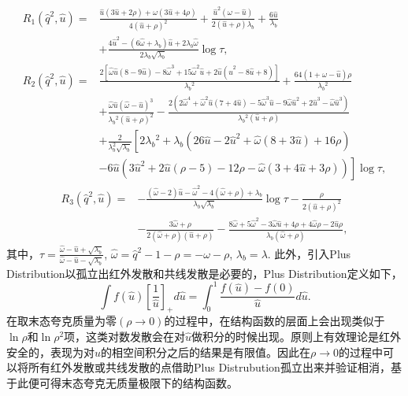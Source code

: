 $$
\begin{aligned}
R_1\left(\hat{q}^2, \hat{u}\right)= & \frac{\hat{u}(3 \hat{u}+2 \rho)+\omega(3 \hat{u}+4 \rho)}{4(\hat{u}+\rho)^2}+\frac{\hat{u}^2(\omega-\hat{u})}{2(\hat{u}+\rho) \lambda_b}+\frac{6 \hat{u}}{\lambda_b} \\
& +\frac{4 \hat{u}^2-\left(6 \hat{\omega}+\lambda_b\right) \hat{u}+2 \lambda_b \hat{\omega}}{2 \lambda_b \sqrt{\lambda_b}} \log \tau, \\
R_2\left(\hat{q}^2, \hat{u}\right)= & \frac{2\left[\hat{\omega} \hat{u}(8-9 \hat{u})-8 \hat{\omega}^3+15 \hat{\omega}^2 \hat{u}+2 \hat{u}\left(\hat{u}^2-8 \hat{u}+8\right)\right]}{\lambda_b{ }^2}+\frac{64(1+\hat{\omega}-\hat{u}) \rho}{\lambda_b{ }^2} \\
& +\frac{\hat{\omega} \hat{u}(\hat{\omega}-\hat{u})^3}{\lambda_b{ }^2(\hat{u}+\rho)^2}-\frac{2\left(2 \hat{\omega}^4+\hat{\omega}^2 \hat{u}(7+4 \hat{u})-5 \hat{\omega}^3 \hat{u}-9 \hat{\omega} \hat{u}^2+2 \hat{u}^3-\hat{\omega} \hat{u}^3\right)}{\lambda_b{ }^2(\hat{u}+\rho)} \\
& +\frac{2}{\lambda_b^2 \sqrt{\lambda_b}}\left[2 \lambda_b{ }^2+\lambda_b\left(26 \hat{u}-2 \hat{u}^2+\hat{\omega}(8+3 \hat{u})+16 \rho\right)\right. \\
& \left.-6 \hat{u}\left(3 \hat{u}^2+2 \hat{u}(\rho-5)-12 \rho-\hat{\omega}(3+4 \hat{u}+3 \rho)\right)\right] \log \tau,
\end{aligned}
$$
$$
\begin{aligned}
R_3\left(\hat{q}^2, \hat{u}\right)= & -\frac{(\hat{\omega}-2) \hat{u}-\hat{\omega}^2-4(\hat{\omega}+\rho)+\lambda_b}{\lambda_b \sqrt{\lambda_b}} \log \tau-\frac{\rho}{2(\hat{u}+\rho)^2} \\
& -\frac{3 \hat{\omega}+\rho}{2(\hat{\omega}+\rho)(\hat{u}+\rho)}-\frac{8 \hat{\omega}+5 \hat{\omega}^2-3 \hat{\omega} \hat{u}+4 \rho+4 \hat{\omega} \rho-2 \hat{u} \rho}{\lambda_b(\hat{\omega}+\rho)},
\end{aligned}
$$
其中，$\tau=\frac{\hat{\omega}-\hat{u}+\sqrt{\lambda_b}}{\hat{\omega}-\hat{u}-\sqrt{\lambda_b}}$, $\hat{\omega}=\hat{q}^2-1-\rho=-\omega-\rho$, $\lambda_{b}=\lambda$.
此外，引入Plus Distribution以孤立出红外发散和共线发散是必要的，Plus Distribution定义如下，
\begin{equation}
    \int f(\hat{u})\left[\frac{1}{\hat{u}}\right]_{+} d \hat{u}=\int_0^1 \frac{f(\hat{u})-f(0)}{\hat{u}} d \hat{u}.
    \label{eq:pb_def}
    \end{equation}
在取末态夸克质量为零$(\rho\to 0)$的过程中，在结构函数的层面上会出现类似于$\ln \rho$和$\ln \rho^2$项，这类对数发散会在对$\hat{u}$做积分的时候出现。原则上有效理论是红外安全的，表现为对$\hat{u}$的相空间积分之后的结果是有限值。因此在$\rho\to 0$的过程中可以将所有红外发散或共线发散的点借助Plus Distrubution孤立出来并验证相消，基于此便可得末态夸克无质量极限下的结构函数。
